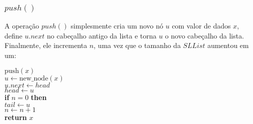 \documentclass{beamer}
\begin{document}
\setlength{\FrameSep}{1pt}
\begin{frame}
\frametitle{$push()$}
A operação $push()$ simplesmente cria um novo nó $u$ com valor de dados $x$, 
define $u.next$ no cabeçalho antigo da lista e torna $u$ o novo cabeçalho 
da lista. Finalmente, ele incrementa $n$, uma vez que o tamanho da $SLList$ 
aumentou em um:

\begin{framed}
\begin{flushleft}
 \ensuremath{\mathrm{push}(\ensuremath{\mathit{x}})}\\
\hspace*{1em} \hspace*{1em} \ensuremath{\ensuremath{\mathit{u}} \gets  \ensuremath{\mathrm{new\_node}(\ensuremath{\mathit{x}})}}\\
\hspace*{1em} \hspace*{1em} \ensuremath{\ensuremath{\mathit{u}}.\ensuremath{next} \gets  \ensuremath{head}}\\
\hspace*{1em} \hspace*{1em} \ensuremath{\ensuremath{\mathit{head}} \gets  \ensuremath{u}}\\
\hspace*{1em} \hspace*{1em} {\color{black} \textbf{if}} \ensuremath{\ensuremath{\mathit{n}} = 0} {\color{black} \textbf{then}} \\
\hspace*{1em} \hspace*{1em} \hspace*{1em} \ensuremath{\ensuremath{\mathit{tail}} \gets  \ensuremath{u}}\\
\hspace*{1em} \hspace*{1em} \ensuremath{\ensuremath{\mathit{n}} \gets  \ensuremath{\ensuremath{\mathit{n}} + 1}}\\
\hspace*{1em} \hspace*{1em} {\color{black} \textbf{return}} \ensuremath{\ensuremath{\mathit{x}}}\\
\end{flushleft}
\end{framed}

\end{frame}
\end{document}
